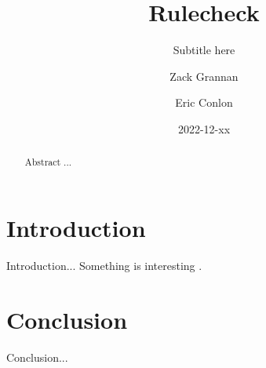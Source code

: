 \documentclass[format=sigconf, nonacm=true, review=true, screen=true]{acmart}
\title{Rulecheck}
\subtitle{Subtitle here}
\author{Zack Grannan}
\author{Eric Conlon}
\date{2022-12-xx}
\begin{document}
\begin{abstract}

Abstract ...

\end{abstract}

\maketitle

\section{Introduction}

Introduction... Something is interesting \cite{kiselyov2005backtracking} \cite{userguide}.

\section{Conclusion}

Conclusion...



\end{document}
